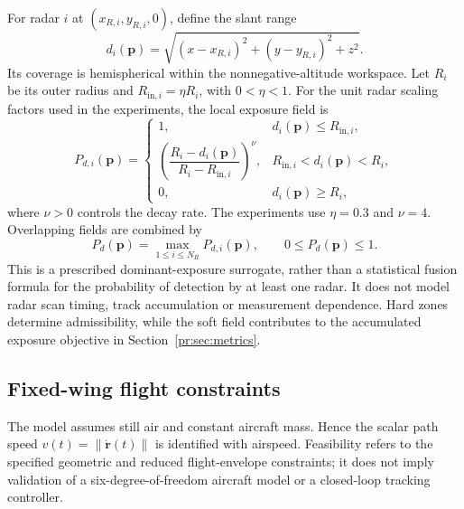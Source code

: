 For radar $i$ at $(x_{R,i},y_{R,i},0)$, define the slant range
\begin{equation}
 d_i(\mathbf{p})=\sqrt{(x-x_{R,i})^2+(y-y_{R,i})^2+z^2}.
 \label{pr:eq:slant}
\end{equation}
Its coverage is hemispherical within the nonnegative-altitude workspace.
Let $R_i$ be its outer radius and $R_{\mathrm{in},i}=\eta R_i$, with
$0<\eta<1$. For the unit radar scaling factors used in the experiments,
the local exposure field is
\begin{equation}
 P_{d,i}(\mathbf{p})=
 \begin{cases}
  1, & d_i(\mathbf{p})\le R_{\mathrm{in},i},\\
  \left(\dfrac{R_i-d_i(\mathbf{p})}{R_i-R_{\mathrm{in},i}}\right)^{\nu},
       & R_{\mathrm{in},i}<d_i(\mathbf{p})<R_i,\\
  0, & d_i(\mathbf{p})\ge R_i,
 \end{cases}
 \label{pr:eq:exposurefield}
\end{equation}
where $\nu>0$ controls the decay rate. The experiments use $\eta=0.3$
and $\nu=4$. Overlapping fields are combined by
\begin{equation}
 P_d(\mathbf{p})=\max_{1\le i\le N_R}P_{d,i}(\mathbf{p}),
 \qquad 0\le P_d(\mathbf{p})\le1.
 \label{pr:eq:maxfield}
\end{equation}
This is a prescribed dominant-exposure surrogate, rather than a statistical
fusion formula for the probability of detection by at least one radar.
It does not model radar scan timing, track accumulation or measurement
dependence. Hard zones determine admissibility, while the soft field
contributes to the accumulated exposure objective in
Section~\ref{pr:sec:metrics}.

\subsection{Fixed-wing flight constraints}
\label{pr:sec:constraints}
The model assumes still air and constant aircraft mass. Hence the scalar
path speed $v(t)=\|\dot{\mathbf{r}}(t)\|$ is identified with airspeed.
Feasibility refers to the specified geometric and reduced flight-envelope
constraints; it does not imply validation of a six-degree-of-freedom
aircraft model or a closed-loop tracking controller.

